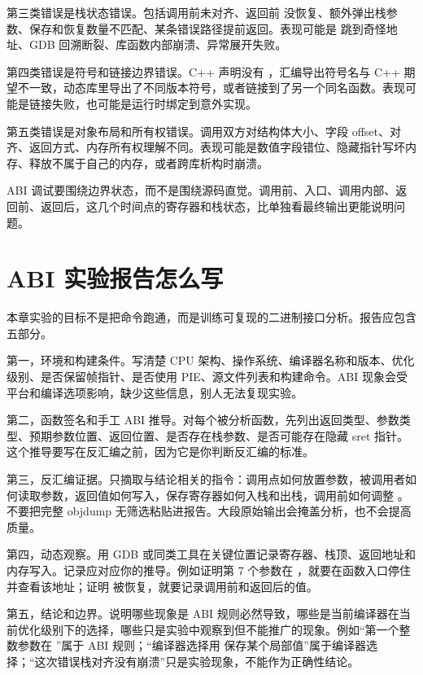 第三类错误是栈状态错误。包括调用前未对齐、返回前  没恢复、额外弹出栈参数、保存和恢复数量不匹配、某条错误路径提前返回。表现可能是  跳到奇怪地址、GDB 回溯断裂、库函数内部崩溃、异常展开失败。

第四类错误是符号和链接边界错误。C++ 声明没有 ，汇编导出符号名与 C++ 期望不一致，动态库里导出了不同版本符号，或者链接到了另一个同名函数。表现可能是链接失败，也可能是运行时绑定到意外实现。

第五类错误是对象布局和所有权错误。调用双方对结构体大小、字段 offset、对齐、返回方式、内存所有权理解不同。表现可能是数值字段错位、隐藏指针写坏内存、释放不属于自己的内存，或者跨库析构时崩溃。

\begin{keyidea}
ABI 调试要围绕边界状态，而不是围绕源码直觉。调用前、入口、调用内部、返回前、返回后，这几个时间点的寄存器和栈状态，比单独看最终输出更能说明问题。
\end{keyidea}

\section{ABI 实验报告怎么写}

本章实验的目标不是把命令跑通，而是训练可复现的二进制接口分析。报告应包含五部分。

第一，环境和构建条件。写清楚 CPU 架构、操作系统、编译器名称和版本、优化级别、是否保留帧指针、是否使用 PIE、源文件列表和构建命令。ABI 现象会受平台和编译选项影响，缺少这些信息，别人无法复现实验。

第二，函数签名和手工 ABI 推导。对每个被分析函数，先列出返回类型、参数类型、预期参数位置、返回位置、是否存在栈参数、是否可能存在隐藏 sret 指针。这个推导要写在反汇编之前，因为它是你判断反汇编的标准。

第三，反汇编证据。只摘取与结论相关的指令：调用点如何放置参数，被调用者如何读取参数，返回值如何写入，保存寄存器如何入栈和出栈，调用前如何调整 。不要把完整 objdump 无筛选粘贴进报告。大段原始输出会掩盖分析，也不会提高质量。

第四，动态观察。用 GDB 或同类工具在关键位置记录寄存器、栈顶、返回地址和内存写入。记录应对应你的推导。例如证明第 7 个参数在 \code{[rsp + 8]}，就要在函数入口停住并查看该地址；证明  被恢复，就要记录调用前和返回后的值。

第五，结论和边界。说明哪些现象是 ABI 规则必然导致，哪些是当前编译器在当前优化级别下的选择，哪些只是实验中观察到但不能推广的现象。例如“第一个整数参数在 ”属于 ABI 规则；“编译器选择用  保存某个局部值”属于编译器选择；“这次错误栈对齐没有崩溃”只是实验现象，不能作为正确性结论。

